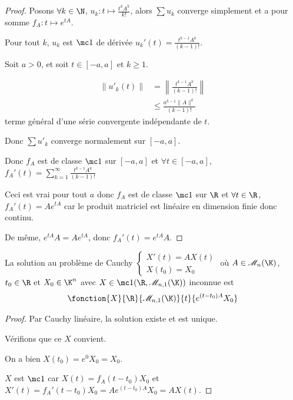\begin{proof}
    Posons $\forall k \in \N$, $u_k: t \mapsto \frac{t^k A^k}{k!}$, alors 
    $\sum u_k$ converge simplement et a pour somme $f_A : t \mapsto e^{tA}$.

    Pour tout $k$, $u_k$ est $\mc 1$ de dérivée $u_k'(t) = \frac{t^{k - 1} A^k}{(k - 1)!}$.

    Soit $a > 0$, et soit $t \in [-a, a]$ et $k \geqslant 1$. 

    \begin{align}
        \| u'_k(t) \| & = \left\| \frac{t^{k - 1} A^k}{(k - 1)!} \right\| \\
        & \leqslant \frac{a^{k - 1} \| A \|^k}{(k - 1)!}
    \end{align}
    terme général d'une série convergente indépendante de $t$. 

    Donc $\sum u'_k$ converge normalement sur $[-a, a]$.

    Donc $f_A$ est de classe $\mc 1$ sur $[-a, a]$ et $\forall t \in [-a, a]$, $f_A'(t) = \sum_{k = 1}^\infty \frac{t^{k - 1} A^k}{(k - 1)!}$

    Ceci est vrai pour tout $a$ donc $f_A$ est de classe $\mc 1$ sur $\R$ et $\forall t \in \R$, 
    $f_A'(t) = A e^{tA}$ car le produit matriciel est linéaire en dimension finie donc continu. 

    De même, $e^{tA} A = A e^{tA}$, donc $f_A'(t) = e^{tA} A$.
\end{proof}

\begin{theoreme}{}{}
    La solution au problème de Cauchy $\begin{cases}
    X'(t) = A X(t) \\
    X(t_0) = X_0
    \end{cases}$ où $A \in \mathscr M_n(\K)$, $t_0 \in \R$ et $X_0 \in \K^n$ avec $X \in \mc 1 (\R, \mathscr M_{n, 1}(\K))$ inconnue
    est $$\fonction{X}{\R}{\mathscr M_{n, 1}(\K)}{t}{e^{(t - t_0) A} X_0}$$
\end{theoreme}

\begin{proof}
    Par Cauchy linéaire, la solution existe et est unique. 

    Vérifions que ce $X$ convient. 

    On a bien $X(t_0) = e^0 X_0 = X_0$.

    $X$ est $\mc 1$ car $X(t) = f_A(t - t_0) X_0$ et $X'(t) = f_A'(t - t_0) X_0 = A e^{(t - t_0) A} X_0 = A X(t)$.
\end{proof}

